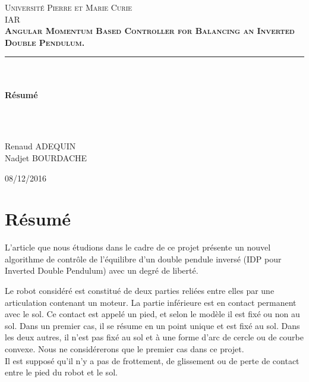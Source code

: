 \documentclass[a4paper,12pt]{report}
\newcommand{\HRule}{\rule{\linewidth}{0.5mm}}
\begin{document}
\begin{titlepage}
  \begin{sffamily}
  \begin{center}

    \textsc{ Université Pierre et Marie Curie \\[1cm] \huge IAR}\\[6cm]


    \textsc{\huge \bfseries Angular Momentum Based Controller for Balancing an Inverted Double Pendulum.}\\
    \HRule \\[0.4cm]
    ~~\\
    \huge \bfseries Résumé

~~\\
~~\\
    \begin{minipage}{0.4\textwidth}
      \begin{center} \large
        Renaud \textsc{ADEQUIN}\\
        Nadjet \textsc{BOURDACHE}\\
      \end{center}
    \end{minipage}

    \vfill

    {\large 08/12/2016}

  \end{center}
  \end{sffamily}
\end{titlepage}

\section*{ Résumé }

L'article que nous étudions dans le cadre de ce projet présente un nouvel algorithme de contrôle de l'équilibre d'un double pendule inversé (IDP pour Inverted Double Pendulum) avec un degré de liberté.

Le robot considéré est constitué de deux parties reliées entre elles par une articulation contenant un moteur. La partie inférieure est en contact permanent avec le sol. Ce contact est appelé un pied, et selon le modèle il est fixé ou non au sol. Dans un premier cas, il se résume en un point unique et est fixé au sol. Dans les deux autres, il n'est pas fixé au sol et à une forme d'arc de cercle ou de courbe convexe. Nous ne considérerons que le premier cas dans ce projet.\\
Il est supposé qu'il n'y a pas de frottement, de glissement ou de perte de contact entre le pied du robot et le sol.
\end{document}

